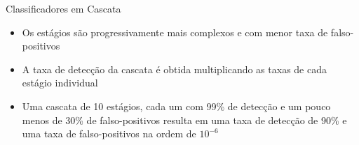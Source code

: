 \begin{frame}{Classificadores em Cascata}
\begin{itemize}
    \item Os estágios são progressivamente mais complexos e com menor taxa de falso-positivos
    \item A taxa de detecção da cascata é obtida multiplicando as taxas de cada estágio individual
    \item Uma cascata de 10 estágios, cada um com 99\% de detecção e um pouco menos de 30\% de falso-positivos resulta em uma taxa de detecção de 90\% e uma taxa de falso-positivos na ordem de $10^{-6}$
\end{itemize}
\end{frame}

